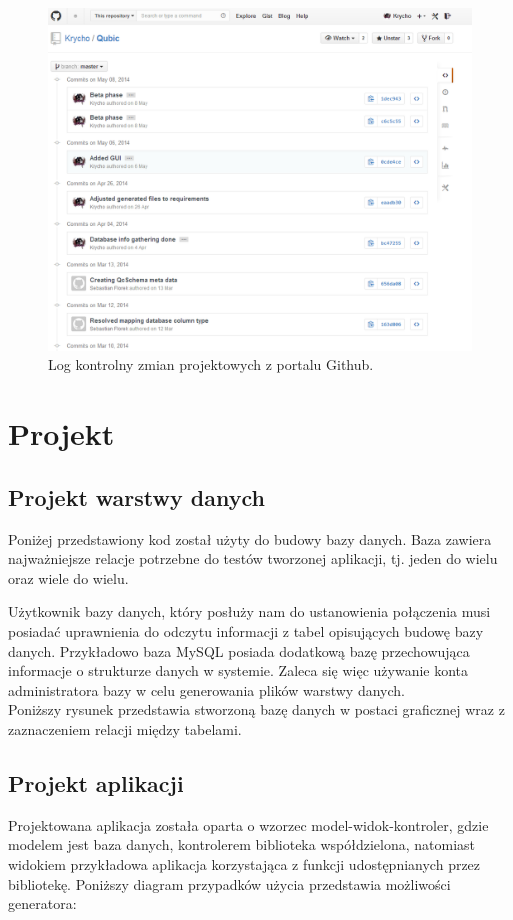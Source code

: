\documentclass[12pt]{report}
\begin{document}
\begin{figure}[h]
	\centering
	\includegraphics[width=.9\textwidth]{images/git.png}
	\caption{Log kontrolny zmian projektowych z portalu Github.}
\end{figure}
\FloatBarrier
\section{Projekt}
\subsection{Projekt warstwy danych}\label{sec:database}
\indent Poniżej przedstawiony kod został użyty do budowy bazy danych. Baza zawiera najważniejsze relacje potrzebne do testów tworzonej aplikacji, tj. jeden do wielu oraz wiele do wielu.
\begin{framed}

\end{framed}

Użytkownik bazy danych, który posłuży nam do ustanowienia połączenia musi posiadać uprawnienia do odczytu informacji z tabel opisujących budowę bazy danych. Przykładowo baza MySQL posiada dodatkową bazę przechowująca informacje o strukturze danych w systemie. Zaleca się więc używanie konta administratora bazy w celu generowania plików warstwy danych.\\
\indent Poniższy rysunek przedstawia stworzoną bazę danych w postaci graficznej wraz z zaznaczeniem relacji między tabelami.
\subsection{Projekt aplikacji}
	\indent Projektowana aplikacja została oparta o wzorzec model-widok-kontroler, gdzie modelem jest baza danych, kontrolerem biblioteka współdzielona, natomiast widokiem przykładowa aplikacja korzystająca z funkcji udostępnianych przez bibliotekę. Poniższy diagram przypadków użycia przedstawia możliwości generatora:
\end{document}
